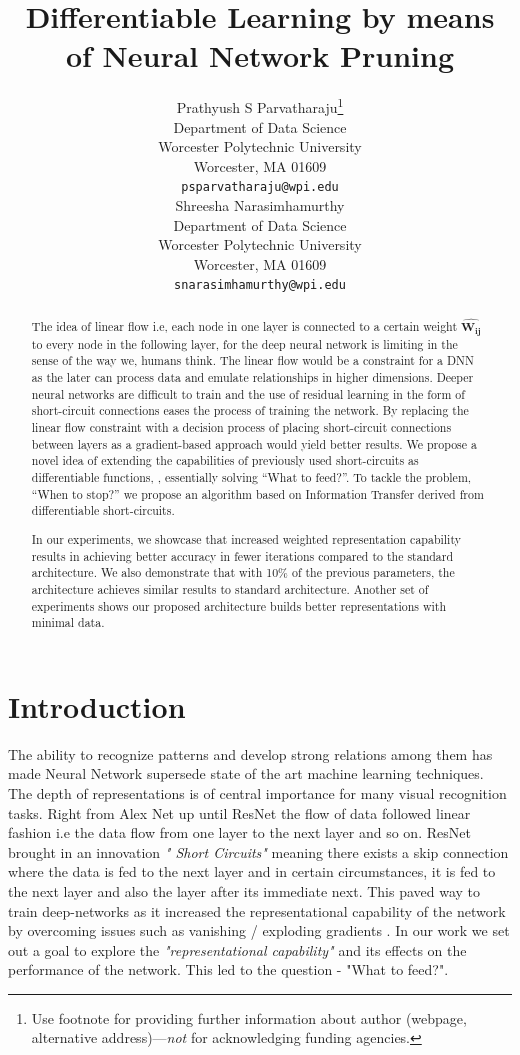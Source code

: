 \usepackage{}\documentclass{article}
\title{Differentiable Learning by means of Neural Network Pruning}
\author{
  Prathyush S Parvatharaju\thanks{Use footnote for providing further
    information about author (webpage, alternative
    address)---\emph{not} for acknowledging funding agencies.} \\
  Department of Data Science\\
  Worcester Polytechnic University\\
  Worcester, MA 01609 \\
  \texttt{psparvatharaju@wpi.edu} \\
   \And
 Shreesha Narasimhamurthy \\
  Department of Data Science\\
  Worcester Polytechnic University\\
  Worcester, MA 01609 \\
  \texttt{snarasimhamurthy@wpi.edu} \\
}
\let\oldhat\hat
\renewcommand{\hat}[1]{\oldhat{\mathbf{#1}}}
\begin{document}
\maketitle

\begin{abstract}
The idea of linear flow i.e, each node in one layer is connected to a certain weight $\hat{W_{ij}}$ to every node in the following layer, for the deep neural network is limiting in the sense of the way we, humans think. The linear flow would be a constraint for a DNN as the later can process data and emulate relationships in higher dimensions. Deeper neural networks are difficult to train and the use of residual learning \cite{He2016DeepRL} in the form of short-circuit connections eases the process of training the network. By replacing the linear flow constraint with a decision process of placing short-circuit connections between layers as a gradient-based approach would yield better results. We propose a novel idea of extending the capabilities of previously used short-circuits as differentiable functions, \cite{Trask2018NeuralAL}, essentially solving “What to feed?”. To tackle the problem, “When to stop?” we propose an algorithm based on Information Transfer derived from differentiable short-circuits. 

In our experiments, we showcase that increased weighted representation capability results in achieving better accuracy in fewer iterations compared to the standard architecture. We also demonstrate that with 10\% of the previous parameters, the architecture achieves similar results to standard architecture. Another set of experiments shows our proposed architecture builds better representations with minimal data.
\end{abstract}




\section{Introduction}
The ability to recognize patterns and develop strong relations among them has made Neural Network supersede state of the art machine learning techniques. The depth of representations is of central importance for many visual recognition tasks. Right from Alex Net \cite{Krizhevsky2012ImageNetCW} up until ResNet \cite{He2016DeepRL} the flow of data followed linear fashion i.e the data flow from one layer to the next layer and so on. ResNet brought in an innovation \emph{" Short Circuits"} meaning there exists a skip connection where the data is fed to the next layer and in certain circumstances, it is fed to the next layer and also the layer after its immediate next. This paved way to train deep-networks as it increased the representational capability of the network by overcoming issues such as vanishing / exploding gradients \cite{Bengio1994LearningLD, Glorot2010UnderstandingTD}. In our work we set out a goal to explore the \emph{"representational capability"} and its effects on the performance of the network. This led to the question - "What to feed?".
\end{document}

